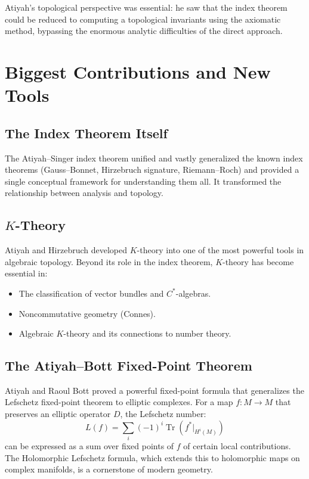 Atiyah's topological perspective was essential: he saw that the index theorem could be reduced to computing a topological invariants using the axiomatic method, bypassing the enormous analytic difficulties of the direct approach.

\section{Biggest Contributions and New Tools}

\subsection{The Index Theorem Itself}

The Atiyah--Singer index theorem unified and vastly generalized the known index theorems (Gauss--Bonnet, Hirzebruch signature, Riemann--Roch) and provided a single conceptual framework for understanding them all. It transformed the relationship between analysis and topology.

\subsection{\texorpdfstring{$K$}{K}-Theory}

Atiyah and Hirzebruch developed $K$-theory into one of the most powerful tools in algebraic topology. Beyond its role in the index theorem, $K$-theory has become essential in:
\begin{itemize}
\item The classification of vector bundles and $C^*$-algebras.
\item Noncommutative geometry (Connes).
\item Algebraic $K$-theory and its connections to number theory.
\end{itemize}

\subsection{The Atiyah--Bott Fixed-Point Theorem}

Atiyah and Raoul Bott proved a powerful fixed-point formula that generalizes the Lefschetz fixed-point theorem to elliptic complexes. For a map $f: M \to M$ that preserves an elliptic operator $D$, the Lefschetz number:
\[
L(f) = \sum_i (-1)^i \operatorname{Tr}(f^*|_{H^i(M)})
\]
can be expressed as a sum over fixed points of $f$ of certain local contributions. The Holomorphic Lefschetz formula, which extends this to holomorphic maps on complex manifolds, is a cornerstone of modern geometry.

